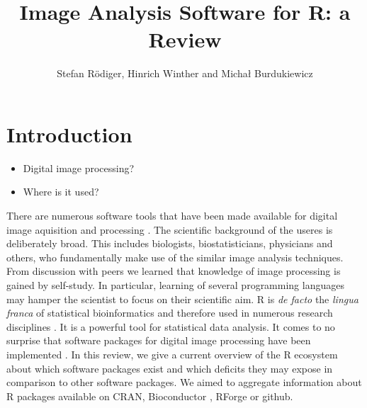 \title{Image Analysis Software for R: a Review}
\author{Stefan R\"{o}diger, Hinrich Winther and Micha\l{} Burdukiewicz}

\maketitle


\section{Introduction}

\begin{itemize}
\item Digital image processing?
\item Where is it used?
\end{itemize}

There are numerous software tools that have been made available for digital 
image aquisition and processing \citep{wiesmann_review_2015, chieco_image_2013}. 
The scientific background of the useres is deliberately broad. This includes 
biologists, biostatisticians, physicians and others, who fundamentally make use 
of the similar image analysis techniques. From discussion with peers we learned 
that knowledge of image processing is gained by self-study. In particular, 
learning of several programming languages may hamper the scientist to focus on 
their scientific aim. R \citep{R} is \textit{de facto} the \textit{lingua 
franca} of statistical bioinformatics and therefore used in numerous research 
disciplines \citep{rodiger_r_2015}. It is a powerful tool for statistical data 
analysis. It comes to no surprise that software packages for digital image 
processing have been implemented \citep{frery_introduction_2013}. In this 
review, we give a current overview of the R ecosystem about which software 
packages exist and which deficits they may expose in comparison to other 
software packages. We aimed to aggregate information about R packages available 
on CRAN, Bioconductor \citep{gentleman_bioconductor:_2004}, RForge or github.

